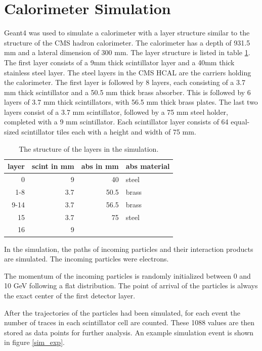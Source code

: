 \documentclass[12pt, a4paper]{thesis}
\begin{document}
\section{Calorimeter Simulation}
\label{sec:org905cdeb}

Geant4 \cite{geant_simul_toolk} was used to simulate a calorimeter
with a layer structure similar to the structure of the CMS hadron
calorimeter. The calorimeter has a depth of 931.5 mm and a lateral
dimension of 300 mm. The layer structure is listed in table
\ref{fcn_structure}. The first layer consists of a 9mm thick
scintillator layer and a 40mm thick stainless steel layer. The steel
layers in the CMS HCAL are the carriers holding the calorimeter. The
first layer is followed by 8 layers, each consisting of a 3.7 mm thick
scintillator and a 50.5 mm thick brass absorber. This is followed by 6
layers of 3.7 mm thick scintillators, with 56.5 mm thick brass plates.
The last two layers consist of a 3.7 mm scintillator, followed by a 75
mm steel holder, completed with a 9 mm scintillator. Each scintillator
layer consists of 64 equal-sized scintillator tiles each with a height
and width of 75 mm.

\begin{table}[htbp]
  \centering
  \begin{tabular}{rrrl}
    layer & scint in mm & abs in mm & abs material\\
    \hline
    0 & 9 & 40 & steel\\
    1-8 & 3.7 & 50.5 & brass\\
    9-14 & 3.7 & 56.5 & brass\\
    15 & 3.7 & 75 & steel\\
    16 & 9 &  & \\
  \end{tabular}
  \caption{The structure of the layers in the simulation.}
  \label{fcn_structure}
\end{table}

In the simulation, the paths of incoming particles and their
interaction products are simulated. The incoming particles were
electrons.

The momentum of the incoming particles is randomly initialized between
0 and 10 GeV following a flat distribution. The point of arrival of
the particles is always the exact center of the first detector layer.

After the trajectories of the particles had been simulated, for each
event the number of traces in each scintillator cell are counted.
These 1088 values are then stored as data points for further
analysis. An example simulation event is shown in figure \ref{sim_exp}.
\end{document}

